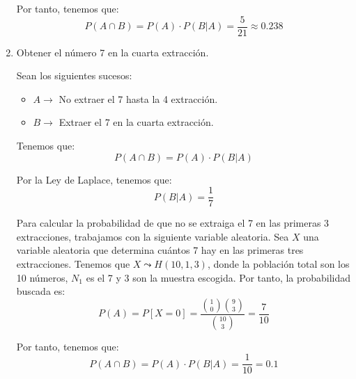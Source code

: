 \begin{ejercicio}
\begin{enumerate}
         Por tanto, tenemos que:
         \begin{equation*}
             P(A\cap B)=P(A)\cdot P(B|A) = \frac{5}{21}\approx 0.238
         \end{equation*}

         
         \item Obtener el número 7 en la cuarta extracción.

         Sean los siguientes sucesos:
         \begin{itemize}
             \item $A\longrightarrow $ No extraer el 7 hasta la 4 extracción.

             \item $B\longrightarrow $ Extraer el 7 en la cuarta extracción.
         \end{itemize}
         
         Tenemos que:
         \begin{equation*}
             P(A\cap B)=P(A)\cdot P(B|A)
         \end{equation*}

         Por la Ley de Laplace, tenemos que:
         \begin{equation*}
             P(B|A)=\frac{1}{7}
         \end{equation*}

         Para calcular la probabilidad de que no se extraiga el 7 en las primeras 3 extracciones, trabajamos con la siguiente variable aleatoria. Sea $X$ una variable aleatoria que determina cuántos 7 hay en las primeras tres extracciones. Tenemos que $X\leadsto H(10, 1, 3)$, donde la población total son los 10 números, $N_1$ es el 7 y $3$ son la muestra escogida. Por tanto, la probabilidad buscada es:
         \begin{equation*}
             P(A)=P[X=0]= \frac{\binom{1}{0}\binom{9}{3}}{\binom{10}{3}} = \frac{7}{10}
         \end{equation*}

         Por tanto, tenemos que:
         \begin{equation*}
             P(A\cap B)=P(A)\cdot P(B|A) = \frac{1}{10} = 0.1
         \end{equation*}
     \end{enumerate}
\end{ejercicio}

